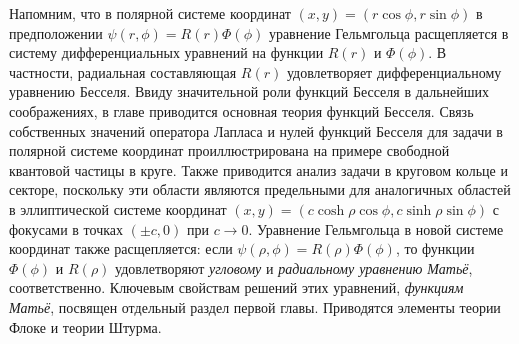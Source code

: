 Напомним, что в полярной системе координат $(x,y) = (r \cos \phi, r \sin \phi)$ в предположении $\psi(r, \phi) = R(r) \Phi(\phi)$ уравнение Гельмгольца расщепляется в систему дифференциальных уравнений на функции $R(r)$ и $\Phi(\phi)$. В частности, радиальная составляющая $R(r)$ удовлетворяет дифференциальному уравнению Бесселя. 
Ввиду значительной роли функций Бесселя в дальнейших соображениях, в главе приводится основная теория функций Бесселя.
Связь собственных значений оператора Лапласа и нулей функций Бесселя для задачи в полярной системе координат проиллюстрирована на примере свободной квантовой частицы в круге. 
Также приводится анализ задачи в круговом кольце и секторе, поскольку эти области являются предельными для аналогичных областей в эллиптической системе координат $(x,y)=(c \cosh \rho \cos \phi, c \sinh \rho \sin \phi)$ с фокусами в точках $(\pm c,0)$ при $c \to 0$.
Уравнение Гельмгольца в новой системе координат также расщепляется: если $\psi(\rho, \phi) = R(\rho) \Phi(\phi)$, то функции $\Phi(\phi)$ и $R(\rho)$ удовлетворяют \textit{угловому} и \textit{радиальному уравнению Матьё}, соответственно.
Ключевым свойствам решений этих уравнений, \textit{функциям Матьё}, посвящен отдельный раздел первой главы. 
Приводятся элементы теории Флоке и теории Штурма. 
